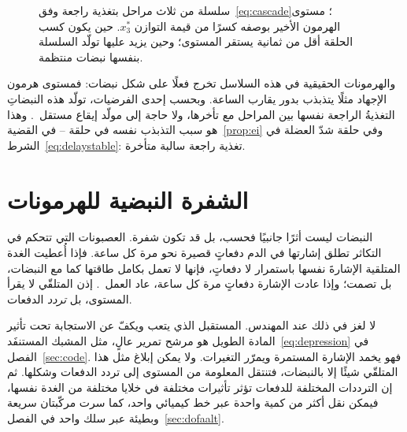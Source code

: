 \begin{figure}[t]
\centering
{}
\caption{سلسلة من ثلاث مراحل بتغذية راجعة وفق~\eqref{eq:cascade}؛ مستوى الهرمون الأخير بوصفه كسرًا من قيمة التوازن $x_3^*$. حين يكون كسب الحلقة أقل من ثمانية يستقر المستوى؛ وحين يزيد عليها تولّد السلسلة بنفسها نبضات منتظمة.}
\label{fig:cascade}
\end{figure}

والهرمونات الحقيقية في هذه السلاسل تخرج فعلًا على شكل نبضات: فمستوى هرمون الإجهاد مثلًا يتذبذب بدور يقارب الساعة. وبحسب إحدى الفرضيات، تولّد هذه النبضاتِ التغذيةُ الراجعة نفسها بين المراحل مع تأخرها، ولا حاجة إلى مولّد إيقاع مستقل~\cite{Walker2010}. وهذا هو سبب التذبذب نفسه في حلقة \foreignlanguage{english}{--} في القضية~\ref{prop:ei} وفي حلقة شدّ العضلة في الشرط~\eqref{eq:delaystable}: تغذية راجعة سالبة متأخرة.

\section{الشفرة النبضية للهرمونات}

النبضات ليست أثرًا جانبيًا فحسب، بل قد تكون شفرة. العصبونات التي تتحكم في التكاثر تطلق إشارتها في الدم دفعاتٍ قصيرة نحو مرة كل ساعة. فإذا أُعطيت الغدة المتلقية الإشارةَ نفسها باستمرار لا دفعاتٍ، فإنها لا تعمل بكامل طاقتها كما مع النبضات، بل تصمت؛ وإذا عادت الإشارة دفعاتٍ مرة كل ساعة، عاد العمل~\cite{Belchetz1978}. إذن المتلقّي لا يقرأ المستوى، بل \emph{تردد} الدفعات.

لا لغز في ذلك عند المهندس. المستقبل الذي يتعب ويكفّ عن الاستجابة تحت تأثير المادة الطويل هو مرشح تمرير عالٍ، مثل المشبك المستنفَد~\eqref{eq:depression} في الفصل~\ref{sec:code}. فهو يخمد الإشارة المستمرة ويمرّر التغيرات. ولا يمكن إبلاغ مثل هذا المتلقّي شيئًا إلا بالنبضات، فتنتقل المعلومة من المستوى إلى تردد الدفعات وشكلها. ثم إن الترددات المختلفة للدفعات تؤثر تأثيرات مختلفة في خلايا مختلفة من الغدة نفسها، فيمكن نقل أكثر من كمية واحدة عبر خط كيميائي واحد، كما سرت مركّبتان سريعة وبطيئة عبر سلك  واحد في الفصل~\ref{sec:dofaalt}.

